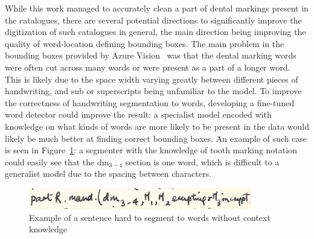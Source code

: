 \documentclass[english,twoside,openright]{UH_DS_MSc}
\begin{document}

While this work managed to accurately clean a part of dental markings present in the catalogues, 
there are several potential directions to significantly improve the digitization of such catalogues in general, the main direction 
being improving the quality of word-location defining bounding boxes. The main problem in the bounding boxes provided 
by Azure Vision~\cite{azurevision} was that the dental marking words were often cut across many words or were present 
as a part of a longer word. This is likely due to the space width varying greatly between different pieces of 
handwriting, and sub or superscripts being unfamiliar to the model. To improve the correctness of handwriting segmentation to words, developing a fine-tuned word detector 
could improve the result: a specialist model encoded with knowledge on what kinds of words are more likely to be 
present in the data would likely be much better at finding correct bounding boxes. An example of 
such case is seen in Figure~\ref{image:hardsentence}: a segmenter with the knowledge of tooth marking notation could 
easily see that the $\text{dm}_{3-4}$ section is one word, which is difficult to a generalist model 
due to the spacing between characters.

\begin{figure}[h]
    \centering
    \includegraphics*[scale=0.8]{images/hardwordsegmentation.png}
    \caption{Example of a sentence hard to segment to words without context knowledge}
    \label{image:hardsentence}
\end{figure}
\end{document}

